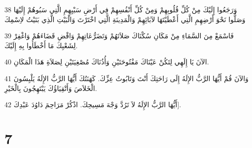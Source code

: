 \par 38 وَرَجَعُوا إِلَيْكَ مِنْ كُلِّ قُلُوبِهِمْ وَمِنْ كُلِّ أَنْفُسِهِمْ فِي أَرْضِ سَبْيِهِمِ الَّتِي سَبُوهُمْ إِلَيْهَا وَصَلُّوا نَحْوَ أَرْضِهِمِ الَّتِي أَعْطَيْتَهَا لآبَائِهِمْ وَالْمَدِينَةِ الَّتِي اخْتَرْتَ وَالْبَيْتِ الَّذِي بَنَيْتُ لاِسْمِكَ
\par 39 فَاسْمَعْ مِنَ السَّمَاءِ مِنْ مَكَانِ سُكْنَاكَ صَلاَتَهُمْ وَتَضَرُّعَاتِهِمْ وَاقْضِ قَضَاءَهُمْ وَاغْفِرْ لِشَعْبِكَ مَا أَخْطَأُوا بِهِ إِلَيْكَ.
\par 40 الآنَ يَا إِلَهِي لِتَكُنْ عَيْنَاكَ مَفْتُوحَتَيْنِ وَأُذُنَاكَ مُصْغِيَتَيْنِ لِصَلاَةِ هَذَا الْمَكَانِ.
\par 41 وَالآنَ قُمْ أَيُّهَا الرَّبُّ الإِلَهُ إِلَى رَاحَتِكَ أَنْتَ وَتَابُوتُ عِزِّكَ. كَهَنَتُكَ أَيُّهَا الرَّبُّ الإِلَهُ يَلْبِسُونَ الْخَلاَصَ وَأَتْقِيَاؤُكَ يَبْتَهِجُونَ بِالْخَيْرِ.
\par 42 أَيُّهَا الرَّبُّ الإِلَهُ لاَ تَرُدَّ وَجْهَ مَسِيحِكَ. اذْكُرْ مَرَاحِمَ دَاوُدَ عَبْدِكَ].

\chapter{7}

